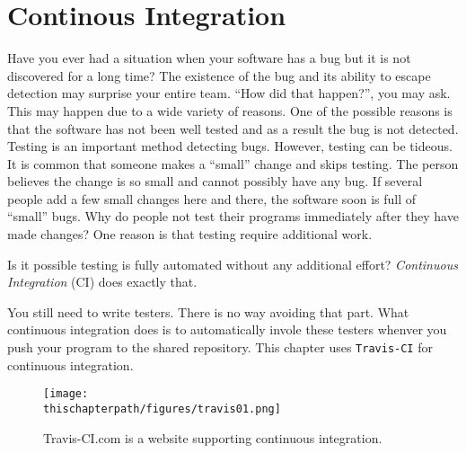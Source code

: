 \chapter{Continous Integration}


Have you ever had a situation when your software has a bug but it is
not discovered for a long time?  The existence of the bug and its
ability to escape detection may surprise your entire team. ``How did
that happen?'', you may ask.  This may happen due to a wide variety of
reasons. One of the possible reasons is that the software has not been
well tested and as a result the bug is not detected. Testing is an
important method detecting bugs.  However, testing can be tideous.  It
is common that someone makes a ``small'' change and skips testing.
The person believes the change is so small and cannot possibly have
any bug.  If several people add a few small changes here and there,
the software soon is full of ``small'' bugs.  Why do people not test
their programs immediately after they have made changes?  One reason
is that testing require additional work.

Is it possible testing is fully automated without any additional
effort? {\it Continuous Integration} (CI) does exactly that.

You still need to write testers. There is no way avoiding that part.
What continuous integration does is to automatically invole these
testers whenver you push your program to the shared repository.
This chapter uses {\tt Travis-CI} for continuous integration.

\begin{figure}[h] \centering
{\texttt{[image: \\thischapterpath/figures/travis01.png]}}
\caption{Travis-CI.com is a website supporting continuous integration.}
\label{fig:travis01}
\end{figure}
